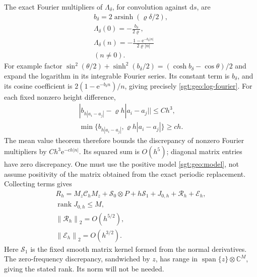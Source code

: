 \documentclass[aps,pra,reprint,superscriptaddress,longbibliography]{revtex4-2}
\newcommand{\dd}{\mathrm d}
\newcommand{\ee}{\mathrm e}
\newcommand{\norm}[1]{\left\lVert#1\right\rVert}
\begin{document}
The exact Fourier multipliers of $\Lambda_\delta$, for convolution
against $\dd s$, are
\begin{equation}
\begin{gathered}
 b_\delta=2\operatorname{arsinh}(\varrho\delta/2),\\
 \Lambda_\delta(0)=-\frac{b_\delta}{2\varrho},\\
 \Lambda_\delta(n)=-\frac{1-\ee^{-b_\delta|n|}}
                            {2\varrho|n|}\\
(n\ne0).
 \label{sgt:geo:log-fourier}
\end{gathered}
\end{equation}
For example factor
$\sin^2(\theta/2)+\sinh^2(b_\delta/2)
=(\cosh b_\delta-\cos\theta)/2$ and expand the logarithm in its
integrable Fourier series.  Its constant term is $b_\delta$, and its
cosine coefficient is $2(1-\ee^{-b_\delta n})/n$, giving precisely
\eqref{sgt:geo:log-fourier}.  For each fixed nonzero height difference,
\[
\begin{gathered}
 |b_{h|a_i-a_j|}-\varrho h|a_i-a_j||\leq Ch^3,\\
 \min\{b_{h|a_i-a_j|},\varrho h|a_i-a_j|\}\geq ch.
\end{gathered}
\]
The mean value theorem therefore bounds the discrepancy of nonzero
Fourier multipliers by $Ch^3\ee^{-ch|n|}$.  Its squared sum is
$O(h^5)$; diagonal matrix entries have zero discrepancy.
One must use the positive model \eqref{sgt:geo:model}, not assume
positivity of the matrix obtained from the exact periodic replacement.
Collecting terms gives
\begin{equation}
\begin{gathered}
 R_h=M_z\mathcal C_hM_z+\mathcal S_0\otimes P+h\mathcal S_1
       +J_{0,h}+\mathcal R_h+\mathcal E_h,
 \\
 \operatorname{rank}J_{0,h}\leq M,\\
 \norm{\mathcal R_h}_2=O(h^{5/2}),\\
 \norm{\mathcal E_h}_2=O(h^{3/2}).
 \label{sgt:geo:normal-form}
\end{gathered}
\end{equation}
Here $\mathcal S_1$ is the fixed smooth matrix kernel formed from the
normal derivatives.  The zero-frequency discrepancy, sandwiched by
$z$, has range in $\operatorname{span}\{z\}\otimes\mathbb C^M$, giving
the stated rank.  Its norm will not be needed.
\end{document}
